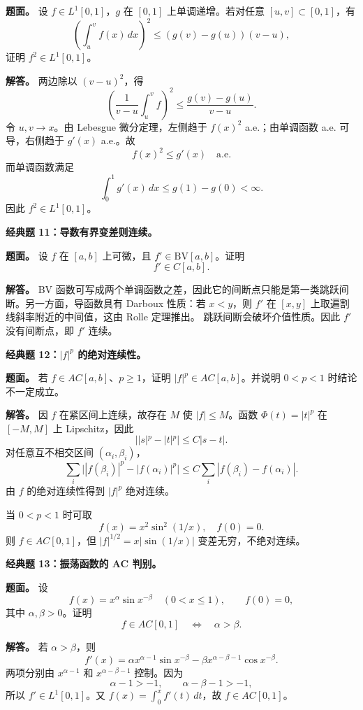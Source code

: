 \documentclass[
UTF8]{ctexart}
\newcommand{\impA}{\hspace{0.4em}{\small\textcolor{impAColor}{\textbf{[A 核心]}}}}
\newcommand{\impB}{\hspace{0.4em}{\small\textcolor{impBColor}{\textbf{[B 重要]}}}}
\begin{document}
\textbf{题面。} 设 \(f\in L^1[0,1]\)，\(g\) 在 \([0,1]\) 上单调递增。若对任意
\([u,v]\subset[0,1]\)，有
\[
  \left(\int_u^v f(x)\,dx\right)^2
  \le (g(v)-g(u))(v-u),
\]
证明 \(f^2\in L^1[0,1]\)。

\textbf{解答。} 两边除以 \((v-u)^2\)，得
\[
  \left(\frac1{v-u}\int_u^v f\right)^2
  \le \frac{g(v)-g(u)}{v-u}.
\]
令 \(u,v\to x\)。由 Lebesgue 微分定理，左侧趋于 \(f(x)^2\) a.e.；由单调函数 a.e.
可导，右侧趋于 \(g'(x)\) a.e.。故
\[
  f(x)^2\le g'(x)\quad\text{a.e.}
\]
而单调函数满足
\[
  \int_0^1 g'(x)\,dx\le g(1)-g(0)<\infty.
\]
因此 \(f^2\in L^1[0,1]\)。

\textbf{经典题 11：导数有界变差则连续。}\impB

\textbf{题面。} 设 \(f\) 在 \([a,b]\) 上可微，且 \(f'\in\mathrm{BV}[a,b]\)。证明
\[
  f'\in C[a,b].
\]

\textbf{解答。} BV 函数可写成两个单调函数之差，因此它的间断点只能是第一类跳跃间断。另一方面，导函数具有 Darboux 性质：若
\(x<y\)，则 \(f'\) 在 \([x,y]\) 上取遍割线斜率附近的中间值，这由 Rolle 定理推出。
跳跃间断会破坏介值性质。因此 \(f'\) 没有间断点，即 \(f'\) 连续。

\textbf{经典题 12：\(|f|^p\) 的绝对连续性。}\impB

\textbf{题面。} 若 \(f\in AC[a,b]\)、\(p\ge1\)，证明 \(|f|^p\in AC[a,b]\)。并说明
\(0<p<1\) 时结论不一定成立。

\textbf{解答。} 因 \(f\) 在紧区间上连续，故存在 \(M\) 使 \(|f|\le M\)。函数
\(\Phi(t)=|t|^p\) 在 \([-M,M]\) 上 Lipschitz，因此
\[
  ||s|^p-|t|^p|\le C|s-t|.
\]
对任意互不相交区间 \((\alpha_i,\beta_i)\)，
\[
  \sum_i\bigl||f(\beta_i)|^p-|f(\alpha_i)|^p\bigr|
  \le C\sum_i|f(\beta_i)-f(\alpha_i)|.
\]
由 \(f\) 的绝对连续性得到 \(|f|^p\) 绝对连续。

当 \(0<p<1\) 时可取
\[
  f(x)=x^2\sin^2(1/x),\quad f(0)=0.
\]
则 \(f\in AC[0,1]\)，但 \(|f|^{1/2}=x|\sin(1/x)|\) 变差无穷，不绝对连续。

\textbf{经典题 13：振荡函数的 AC 判别。}\impA

\textbf{题面。} 设
\[
  f(x)=x^\alpha\sin x^{-\beta}\quad(0<x\le1),\qquad f(0)=0,
\]
其中 \(\alpha,\beta>0\)。证明
\[
  f\in AC[0,1]\quad\Longleftrightarrow\quad \alpha>\beta.
\]

\textbf{解答。} 若 \(\alpha>\beta\)，则
\[
  f'(x)=\alpha x^{\alpha-1}\sin x^{-\beta}
  -\beta x^{\alpha-\beta-1}\cos x^{-\beta}.
\]
两项分别由 \(x^{\alpha-1}\) 和 \(x^{\alpha-\beta-1}\) 控制。因为
\[
  \alpha-1>-1,\qquad \alpha-\beta-1>-1,
\]
所以 \(f'\in L^1[0,1]\)。又 \(f(x)=\int_0^x f'(t)\,dt\)，故 \(f\in AC[0,1]\)。
\end{document}
